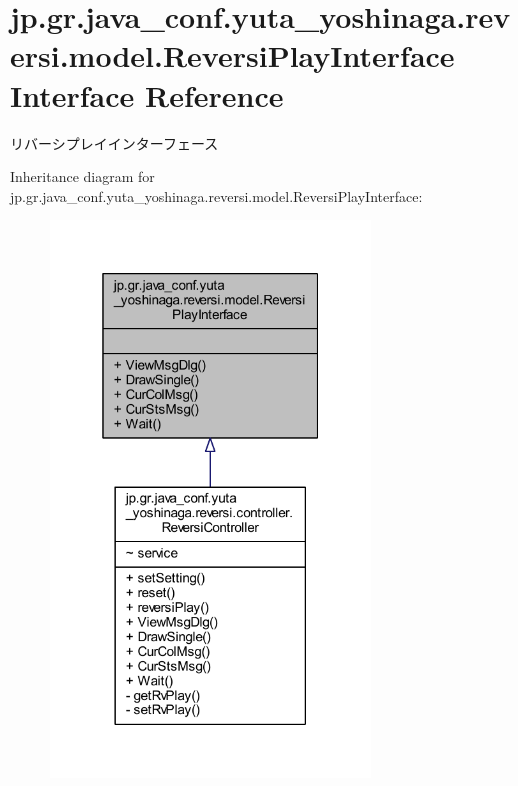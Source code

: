 \hypertarget{interfacejp_1_1gr_1_1java__conf_1_1yuta__yoshinaga_1_1reversi_1_1model_1_1_reversi_play_interface}{}\section{jp.\+gr.\+java\+\_\+conf.\+yuta\+\_\+yoshinaga.\+reversi.\+model.\+Reversi\+Play\+Interface Interface Reference}
\label{interfacejp_1_1gr_1_1java__conf_1_1yuta__yoshinaga_1_1reversi_1_1model_1_1_reversi_play_interface}


リバーシプレイインターフェース  




Inheritance diagram for jp.\+gr.\+java\+\_\+conf.\+yuta\+\_\+yoshinaga.\+reversi.\+model.\+Reversi\+Play\+Interface\+:
\nopagebreak
\begin{figure}[H]
\begin{center}
\leavevmode
\includegraphics[width=241pt]{interfacejp_1_1gr_1_1java__conf_1_1yuta__yoshinaga_1_1reversi_1_1model_1_1_reversi_play_interface__inherit__graph}
\end{center}
\end{figure}


